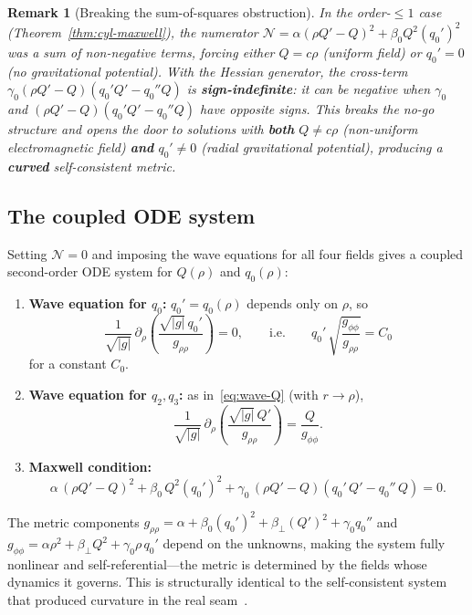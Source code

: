 \documentclass[pdflatex,sn-mathphys-num]{sn-jnl}
\theoremstyle{thmstyleone}%
\theoremstyle{thmstyletwo}%
\newtheorem{remark}[theorem]{Remark}
\theoremstyle{thmstylethree}%
\newcommand{\pa}{\partial}
\numberwithin{equation}{section}
\begin{document}
\begin{remark}[Breaking the sum-of-squares obstruction]
\label{rem:hessian-breaking}
In the order-$\le 1$ case (Theorem~\ref{thm:cyl-maxwell}),
the numerator $\mathcal{N} = \alpha(\rho Q'-Q)^2
+ \beta_0 Q^2(q_0')^2$ was a sum of non-negative terms,
forcing either $Q = c\rho$ (uniform field) or $q_0' = 0$
(no gravitational potential).  With the Hessian generator,
the cross-term $\gamma_0(\rho Q'-Q)(q_0' Q' - q_0'' Q)$
is \textbf{sign-indefinite}: it can be negative when
$\gamma_0$ and $(\rho Q'-Q)(q_0' Q' - q_0'' Q)$ have
opposite signs.  This breaks the no-go structure and opens
the door to solutions with \textbf{both} $Q \neq c\rho$
(non-uniform electromagnetic field) \textbf{and} $q_0' \neq 0$
(radial gravitational potential), producing a
\textbf{curved} self-consistent metric.
\end{remark}

\subsection{The coupled ODE system}

Setting $\mathcal{N} = 0$ and imposing the wave equations for
all four fields gives a coupled second-order ODE system for
$Q(\rho)$ and $q_0(\rho)$:
\begin{enumerate}[label=(\roman*)]
\item\label{item:wave-q0}
  \textbf{Wave equation for $q_0$:}
  $q_0' = q_0(\rho)$ depends only on $\rho$, so
  \begin{equation}
  \label{eq:wave-q0-hess}
  \frac{1}{\sqrt{|g|}}\,\pa_\rho\!\left(
    \frac{\sqrt{|g|}\,q_0'}{g_{\rho\rho}}\right) = 0,
  \qquad\text{i.e.}\qquad
  q_0'\,\sqrt{\frac{g_{\phi\phi}}{g_{\rho\rho}}} = C_0
  \end{equation}
  for a constant $C_0$.

\item\label{item:wave-Q}
  \textbf{Wave equation for $q_2,q_3$:}
  as in~\eqref{eq:wave-Q} (with $r\to\rho$),
  \begin{equation}
  \label{eq:wave-Q-hess}
  \frac{1}{\sqrt{|g|}}\,\pa_\rho\!\left(
    \frac{\sqrt{|g|}\,Q'}{g_{\rho\rho}}\right)
  = \frac{Q}{g_{\phi\phi}}.
  \end{equation}

\item\label{item:maxwell-hess}
  \textbf{Maxwell condition:}
  \begin{equation}
  \label{eq:maxwell-hess}
  \alpha\,(\rho Q'-Q)^2
  + \beta_0\,Q^2(q_0')^2
  + \gamma_0\,(\rho Q'-Q)(q_0'\,Q' - q_0''\,Q) = 0.
  \end{equation}
\end{enumerate}
The metric components
$g_{\rho\rho} = \alpha + \beta_0(q_0')^2 + \beta_\perp(Q')^2
+ \gamma_0 q_0''$ and
$g_{\phi\phi} = \alpha\rho^2 + \beta_\perp Q^2
+ \gamma_0\rho\,q_0'$
depend on the unknowns, making the system fully nonlinear and
self-referential---the metric is determined by the fields whose
dynamics it governs.  This is structurally identical to
the self-consistent system that produced curvature in the real
seam~\cite{seam1}.
\end{document}
